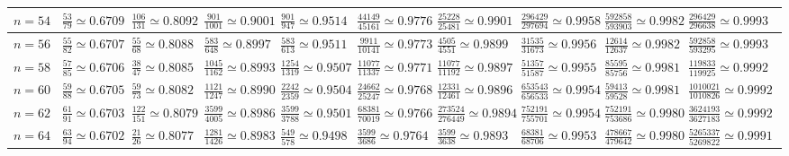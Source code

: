 \begin{landscape}
\begin{table}
\begin{tabular}{|c||c|c|c|c|c|c|c|c|c|c}
$n=54$ & $\frac{53}{79}\simeq0.6709$ & $\frac{106}{131}\simeq0.8092$ & $\frac{901}{1001}\simeq0.9001$ & $\frac{901}{947}\simeq0.9514$ & $\frac{44149}{45161}\simeq0.9776$ & $\frac{25228}{25481}\simeq0.9901$ & $\frac{296429}{297694}\simeq0.9958$ & $\frac{592858}{593903}\simeq0.9982$ & $\frac{296429}{296638}\simeq0.9993$ \\ \hline
$n=56$ & $\frac{55}{82}\simeq0.6707$ & $\frac{55}{68}\simeq0.8088$ & $\frac{583}{648}\simeq0.8997$ & $\frac{583}{613}\simeq0.9511$ & $\frac{9911}{10141}\simeq0.9773$ & $\frac{4505}{4551}\simeq0.9899$ & $\frac{31535}{31673}\simeq0.9956$ & $\frac{12614}{12637}\simeq0.9982$ & $\frac{592858}{593295}\simeq0.9993$ \\ \hline
$n=58$ & $\frac{57}{85}\simeq0.6706$ & $\frac{38}{47}\simeq0.8085$ & $\frac{1045}{1162}\simeq0.8993$ & $\frac{1254}{1319}\simeq0.9507$ & $\frac{11077}{11337}\simeq0.9771$ & $\frac{11077}{11192}\simeq0.9897$ & $\frac{51357}{51587}\simeq0.9955$ & $\frac{85595}{85756}\simeq0.9981$ & $\frac{119833}{119925}\simeq0.9992$ \\ \hline
$n=60$ & $\frac{59}{88}\simeq0.6705$ & $\frac{59}{73}\simeq0.8082$ & $\frac{1121}{1247}\simeq0.8990$ & $\frac{2242}{2359}\simeq0.9504$ & $\frac{24662}{25247}\simeq0.9768$ & $\frac{12331}{12461}\simeq0.9896$ & $\frac{653543}{656533}\simeq0.9954$ & $\frac{59413}{59528}\simeq0.9981$ & $\frac{1010021}{1010826}\simeq0.9992$ \\ \hline
$n=62$ & $\frac{61}{91}\simeq0.6703$ & $\frac{122}{151}\simeq0.8079$ & $\frac{3599}{4005}\simeq0.8986$ & $\frac{3599}{3788}\simeq0.9501$ & $\frac{68381}{70019}\simeq0.9766$ & $\frac{273524}{276449}\simeq0.9894$ & $\frac{752191}{755701}\simeq0.9954$ & $\frac{752191}{753686}\simeq0.9980$ & $\frac{3624193}{3627183}\simeq0.9992$ \\ \hline
$n=64$ & $\frac{63}{94}\simeq0.6702$ & $\frac{21}{26}\simeq0.8077$ & $\frac{1281}{1426}\simeq0.8983$ & $\frac{549}{578}\simeq0.9498$ & $\frac{3599}{3686}\simeq0.9764$ & $\frac{3599}{3638}\simeq0.9893$ & $\frac{68381}{68706}\simeq0.9953$ & $\frac{478667}{479642}\simeq0.9980$ & $\frac{5265337}{5269822}\simeq0.9991$ \\ \hline

\end{tabular}
\end{table}
\end{landscape}


